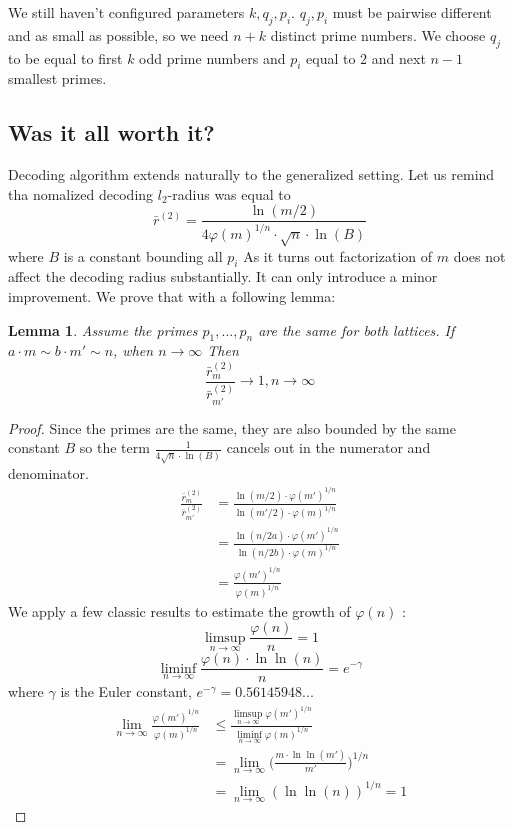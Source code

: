 \documentclass[12pt]{article}
\newtheorem{lemma}{Lemma}
\begin{document}
We still haven't configured parameters $k, q_{j}, p_{i}$. $q_{j}, p_{i}$ must be pairwise different and as small as possible, so we need $n+k$ distinct prime numbers. We choose $q_{j}$ to be equal to first $k$ odd prime numbers and $p_{i}$ equal to $2$ and next $n-1$ smallest primes.
\subsection{Was it all worth it?}
Decoding algorithm extends naturally to the generalized setting. Let us remind tha nomalized decoding $l_{2}$-radius was equal to
\[
    \bar r^{(2)} = \frac{\ln(m/2)}{4 \varphi(m)^{1/n} \cdot \sqrt{n} \cdot \ln(B)}
\]
where $B$ is a constant bounding all $p_{i}$
As it turns out factorization of $m$ does not affect the decoding radius substantially. It can only introduce a minor improvement. We prove that with a following lemma:

\begin{lemma}
Assume the primes $p_{1}, ..., p_{n}$ are the same for both lattices. If $a \cdot m \sim b \cdot m' \sim n$, when $n \rightarrow \infty$ Then
\[
    \frac{\bar r_{m}^{(2)}}{\bar r_{m'}^{(2)}} \rightarrow 1, n \rightarrow \infty
\]
\end{lemma}
\begin{proof}
Since the primes are the same, they are also bounded by the same constant $B$ so the term $\frac{1}{4 \sqrt{n} \cdot \ln(B)}$ cancels out in the numerator and denominator.
\[
\begin{split}
\frac{\bar r_{m}^{(2)}}{\bar r_{m'}^{(2)}}
& = \frac{\ln(m/2) \cdot \varphi(m')^{1/n}}{\ln(m'/2) \cdot \varphi(m)^{1/n}} \\
& = \frac{\ln(n/2a) \cdot \varphi(m')^{1/n}}{\ln(n/2b) \cdot \varphi(m)^{1/n}} \\
& = \frac{\varphi(m')^{1/n}}{\varphi(m)^{1/n}}
\end{split}
\]
We apply a few classic results to estimate the growth of $\varphi(n)$ \cite{[HW09]}:
\[
    \limsup\limits_{n \rightarrow \infty} \frac{\varphi(n)}{n} = 1
\]
\[
    \liminf\limits_{n \rightarrow \infty} \frac{\varphi(n) \cdot \ln\ln(n)}{n} = e^{-\gamma}
\]
where $\gamma$ is the Euler constant, $e^{-\gamma} = 0.56145948...$
\[
\begin{split}
\lim_{n \rightarrow \infty} \frac{\varphi(m')^{1/n}}{\varphi(m)^{1/n}}
& \leq \frac{\limsup\limits_{n \rightarrow \infty} \varphi(m')^{1/n}}{\liminf\limits_{n \rightarrow\infty}\varphi(m)^{1/n}} \\
& = \lim_{n \rightarrow \infty} \bigg(\frac{m \cdot \ln\ln (m')}{m'}\bigg)^{1/n} \\
& = \lim_{n \rightarrow \infty} (\ln\ln(n))^{1/n} = 1
\end{split}
\]
\end{proof}




\end{document}
